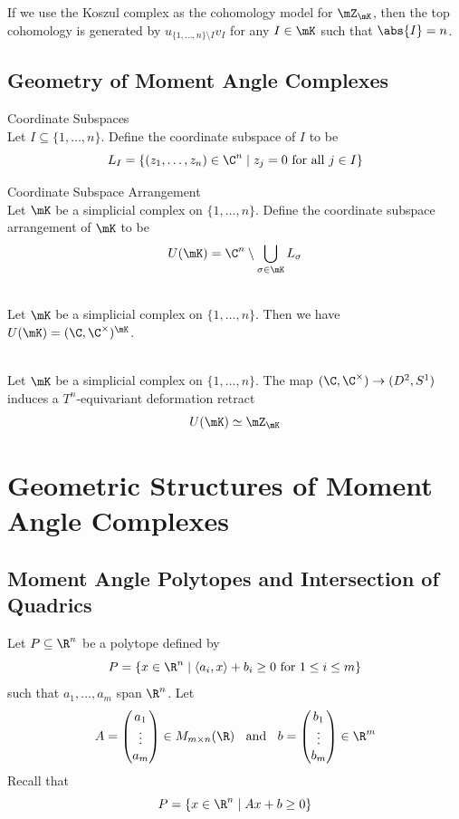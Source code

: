 \documentclass[a4paper]{article}
\begin{document}
If we use the Koszul complex as the cohomology model for $\mZ_\mK$, then the top cohomology is generated by $u_{\{1,\dots,n\}\setminus I}v_I$ for any $I\in\mK$ such that $\abs{I}=n$. 

\subsection{Geometry of Moment Angle Complexes}
\begin{defn}{Coordinate Subspaces}{}\\
Let $I\subseteq\{1,\dots,n\}$. Define the coordinate subspace of $I$ to be $$L_I=\{(z_1,\dots,z_n)\in\C^n\;|\;z_j=0\text{ for all }j\in I\}$$
\end{defn}

\begin{defn}{Coordinate Subspace Arrangement}{}\\
Let $\mK$ be a simplicial complex on $\{1,\dots,n\}$. Define the coordinate subspace arrangement of $\mK$ to be $$U(\mK)=\C^n\setminus\bigcup_{\sigma\in\mK}L_\sigma$$
\end{defn}

\begin{prp}{}{}\\
Let $\mK$ be a simplicial complex on $\{1,\dots,n\}$. Then we have $U(\mK)=(\C,\C^\times)^\mK$. 
\end{prp}

\begin{thm}{}{}\\
Let $\mK$ be a simplicial complex on $\{1,\dots,n\}$. The map $(\C,\C^\times)\to(D^2,S^1)$ induces a $T^n$-equivariant deformation retract $$U(\mK)\simeq\mZ_\mK$$
\end{thm}

\pagebreak
\section{Geometric Structures of Moment Angle Complexes}
\subsection{Moment Angle Polytopes and Intersection of Quadrics}
Let $P\subseteq\R^n$ be a polytope defined by $$P=\{x\in\R^n\;|\;\langle a_i,x\rangle+b_i\geq 0\text{ for }1\leq i\leq m\}$$ such that $a_1,\dots,a_m$ span $\R^n$. Let $$A=\begin{pmatrix}
a_1\\
\vdots\\
a_m
\end{pmatrix}\in M_{m\times n}(\R)\;\;\text{ and }\;\;b=\begin{pmatrix}
b_1\\
\vdots\\
b_m
\end{pmatrix}\in\R^m$$ Recall that $$P=\{x\in\R^n\;|\;Ax+b\geq 0\}$$
\end{document}
